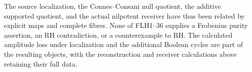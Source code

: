 The source localization, the Connes--Consani null quotient,
the additive supported quotient, and the actual nilpotent
receiver have thus been related by explicit maps and complete
fibres. None of FLH1--36 supplies a Frobenius purity assertion,
an RH contradiction, or a counterexample to RH. The calculated
amplitude loss under localization and the additional Boolean
cycles are part of the resulting objects, with the reconstruction
and receiver calculations above retaining their full data.
